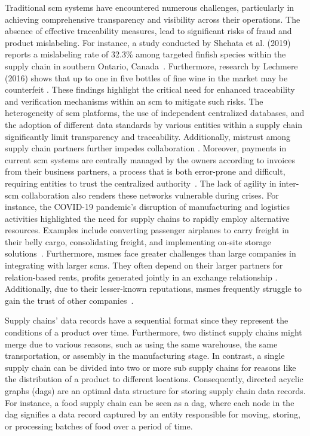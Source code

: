 Traditional \gls{scm} systems have encountered numerous challenges, particularly in achieving comprehensive transparency and visibility across their operations. The absence of effective traceability measures, lead to significant risks of fraud and product mislabeling. For instance, a study conducted by Shehata et al. (2019) reports a mislabeling rate of 32.3\% among targeted finfish species within the supply chain in southern Ontario, Canada~\cite{Shehata2019mislabelling}. Furthermore, research by Lechmere (2016) shows that up to one in five bottles of fine wine in the market may be counterfeit  \cite{Lechmere2016}. These findings highlight the critical need for enhanced traceability and verification mechanisms within an \gls{scm} to mitigate such risks. The heterogeneity of \gls{scm} platforms, the use of independent centralized databases, and the adoption of different data standards by various entities within a supply chain significantly limit transparency and traceability. Additionally, mistrust among supply chain partners further impedes collaboration \cite{Hellani2021Transparency}. Moreover, payments in current  \gls{scm} systems are centrally managed by the owners according to invoices from their business partners, a process that is both error-prone and difficult, requiring entities to trust the centralized authority~\cite{HyperledgerWalmartCasestudy}. The lack of agility in inter-\gls{scm} collaboration also renders these networks vulnerable during crises. For instance, the COVID-19 pandemic's disruption of manufacturing and logistics activities highlighted the need for supply chains to rapidly employ alternative resources. Examples include converting passenger airplanes to carry freight in their belly cargo, consolidating freight, and implementing on-site storage solutions~\cite{Sudan2021}. Furthermore, \glspl{msme} face greater challenges than large companies in integrating with larger \glspl{scm}. They often depend on their larger partners for relation-based rents, profits generated jointly in an exchange relationship \cite{Dyer1998Rents, Arend2005SME}. Additionally, due to their lesser-known reputations, \glspl{msme} frequently struggle to gain the trust of other companies~\cite{Arend2005SME}.

Supply chains' data records have a sequential format since they represent the conditions of a product over time. Furthermore, two distinct supply chains might merge due to various reasons, such as using the same warehouse, the same transportation, or assembly in the manufacturing stage. In contrast, a single supply chain can be divided into two or more sub supply chains for reasons like the distribution of a product to different locations. Consequently, directed acyclic graphs (\glspl{dag}) are an optimal data structure for storing supply chain data records. For instance, a food supply chain can be seen as a \gls{dag}, where each node in the \gls{dag} signifies a data record captured by an entity responsible for moving, storing, or processing batches of food over a period of time. 

